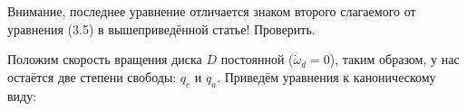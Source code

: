 \documentclass{article}
\begin{document}
{\color{red}Внимание, последнее уравнение отличается знаком второго слагаемого от уравнения (3.5) в вышеприведённой статье! Проверить.}

Положим скорость вращения диска $D$ постоянной ($\dot\omega_d=0$), таким образом, у нас остаётся две степени свободы: $q_c$ и $q_a$.
Приведём уравнения к каноническому виду:
%
\end{document}
